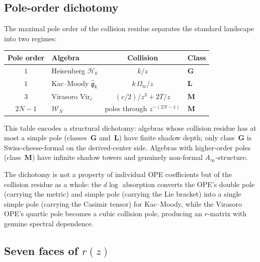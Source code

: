 \documentclass[11pt,reqno]{amsart}
\theoremstyle{definition}
\theoremstyle{remark}
\newcommand{\cH}{\mathcal{H}}
\newcommand{\cW}{\mathcal{W}}
\newcommand{\fg}{\mathfrak{g}}
\newcommand{\Vir}{\mathrm{Vir}}
\numberwithin{equation}{section}
\begin{document}
\subsection{Pole-order dichotomy}
\label{ssec:pole-dichotomy}

The maximal pole order of the collision residue separates the
standard landscape into two regimes:

\begin{center}
\renewcommand{\arraystretch}{1.3}
\begin{tabular}{clcl}
\toprule
\textbf{Pole order} & \textbf{Algebra}
 & \textbf{Collision} & \textbf{Class} \\
\midrule
$1$ & Heisenberg $\cH_k$ & $k/z$ & $\mathbf{G}$ \\
$1$ & Kac--Moody $\widehat{\fg}_k$ & $k\,\Omega_{\mathrm{tr}}/z$ & $\mathbf{L}$ \\
$3$ & Virasoro $\Vir_c$ & $(c/2)/z^3 + 2T/z$ & $\mathbf{M}$ \\
$2N{-}1$ & $\cW_N$ & poles through $z^{-(2N-1)}$
 & $\mathbf{M}$ \\
\bottomrule
\end{tabular}
\end{center}

\noindent
This table encodes a structural dichotomy: algebras whose
collision residue has at most a simple pole (classes~$\mathbf{G}$
and~$\mathbf{L}$) have finite shadow depth; only
class~$\mathbf{G}$ is Swiss-cheese-formal on the
derived-center side. Algebras with higher-order
poles (class~$\mathbf{M}$) have infinite shadow towers and
genuinely non-formal $A_\infty$-structure.

The dichotomy is not a property of individual OPE coefficients
but of the collision residue as a whole: the $d\log$ absorption
converts the OPE's double pole (carrying the metric) and simple
pole (carrying the Lie bracket) into a single simple pole
(carrying the Casimir tensor) for Kac--Moody, while the
Virasoro OPE's quartic pole becomes a cubic collision pole,
producing an $r$-matrix with genuine spectral dependence.

\subsection{Seven faces of $r(z)$}
\label{ssec:seven-faces}
\end{document}

